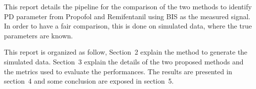 This report details the pipeline for the comparison of the two methods to identify PD parameter from Propofol and Remifentanil using BIS as the measured signal. In order to have a fair comparison, this is done on simulated data, where the true parameters are known.
\medskip

This report is organized as follow, Section~2 explain the method to generate the simulated data. Section~3 explain the details of the two proposed methods and the metrics used to evaluate the performances. The results are presented in section~4 and some conclusion are exposed in section~5.